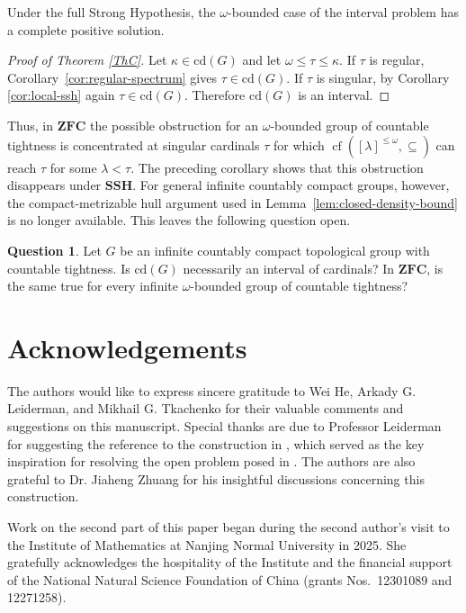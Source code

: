 \documentclass[12pt]{amsart}
\theoremstyle{definition}
\newtheorem{question}[theorem]{Question}
\numberwithin{equation}{section}
\theoremstyle{remark}
\def\cd{\mathrm{cd}}
\begin{document}
Under the full Strong Hypothesis, the $\omega$-bounded case of the
interval problem has a complete positive solution.


\begin{proof}[Proof of Theorem \ref{ThC}]
Let $\kappa\in\cd(G)$ and let $\omega\leq\tau\leq\kappa$. If $\tau$ is
regular, Corollary~\ref{cor:regular-spectrum} gives
$\tau\in\cd(G)$. If $\tau$ is singular, by Corollary \ref{cor:local-ssh} again $\tau\in\cd(G)$.
Therefore $\cd(G)$ is an interval. 
\end{proof}

Thus, in $\mathbf{ZFC}$ the possible obstruction for an
$\omega$-bounded group of countable tightness is concentrated at
singular cardinals $\tau$ for which
$\operatorname{cf}([\lambda]^{\leq\omega},\subseteq)$ can reach
$\tau$ for some $\lambda<\tau$. The preceding corollary shows that this
obstruction disappears under $\mathbf{SSH}$. For general infinite countably
compact groups, however, the compact-metrizable hull argument used in
Lemma~\ref{lem:closed-density-bound} is no longer available. This leaves
the following question open.

\begin{question}
Let $G$ be an infinite countably compact topological group with countable tightness.
Is $\cd(G)$ necessarily an interval of cardinals? In $\mathbf{ZFC}$,
is the same true for every infinite $\omega$-bounded group of countable tightness?
\end{question}
\section*{Acknowledgements}

The authors would like to express sincere gratitude to Wei He, Arkady G. Leiderman, and Mikhail G. Tkachenko for their valuable comments and suggestions on this manuscript. Special thanks are due to Professor Leiderman for suggesting the reference to the construction in \cite{HMRS}, which served as the key inspiration for resolving the open problem posed in \cite{LMT}. The authors are also grateful to Dr. Jiaheng Zhuang for his insightful discussions concerning this construction.

Work on the second part of this paper began during the second author's visit to the Institute of Mathematics at Nanjing Normal University in 2025. She gratefully acknowledges the hospitality of the Institute and the financial support of the National Natural Science Foundation of China (grants Nos.~12301089 and 12271258).
\end{document}
